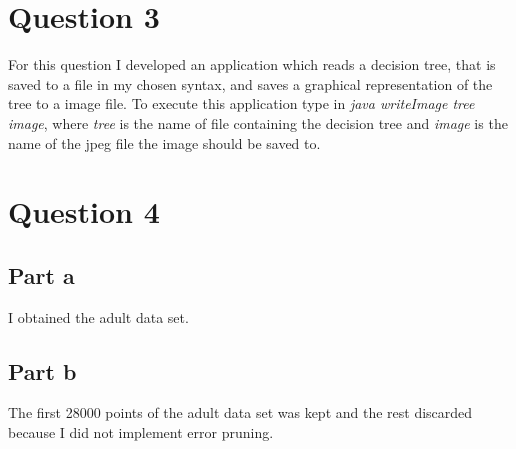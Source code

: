 \documentclass[a4paper,11pt,titlepage]{article}
\begin{document}
\section{Question 3}
For this question I developed an application which reads a decision tree, that is saved to a file in my chosen syntax, and saves a graphical representation of the tree to a image file. To execute this application type in \emph{java writeImage tree image}, where \emph{tree} is the name of file containing the decision tree and \emph{image} is the name of the jpeg file the image should be saved to.
\section{Question 4}
\subsection{Part a}
I obtained the adult data set.
\subsection{Part b}
The first 28000 points of the adult data set was kept and the rest discarded because I did not implement error pruning.
\end{document}
